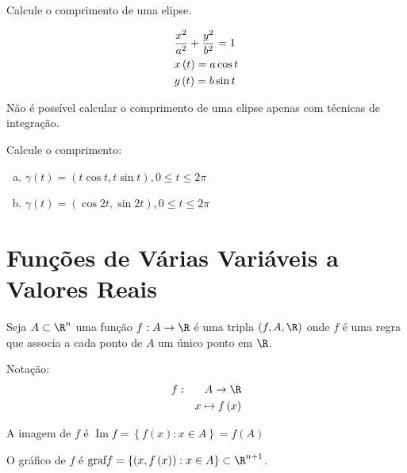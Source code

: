 \documentclass{book}
\begin{document}
\begin{ex}
Calcule o comprimento de uma elipse.

\end{ex}

\begin{sol}
\[
\begin{gathered}
\frac{{x^2 }}
{{a^2 }} + \frac{{y^2 }}
{{b^2 }} = 1 \hfill \\
x\left( t \right) = a\cos t \hfill \\
y\left( t \right) = b\sin t \hfill \\
\end{gathered}
\]

N\~ao \'e poss\'ivel calcular o comprimento de uma elipse apenas com t\'ecnicas de integra\c c\~ao.

\end{sol}

\begin{ex}
Calcule o comprimento:

\begin{enumerate}[a)]
      \item $\gamma \left( t \right) = \left( {t\cos t,t\sin t} \right),0 \leqslant t \leqslant 2\pi$
      \item $\gamma \left( t \right) = \left( {\cos 2t,\sin 2t} \right),0 \leqslant t \leqslant 2\pi$
\end{enumerate}
\end{ex}

\newpage 

\section{Fun\c c\~oes de V\'arias Vari\'aveis a Valores Reais} \label{sec09}

\begin{defn}
    Seja $A \subset \R^n$ uma fun\c c\~ao $f:A \to \R$ \'e uma tripla $\left( {f,A,\R} \right)$ onde $f$ \'e uma regra que associa a cada ponto de $A$ um \'unico ponto em $\R$.

Nota\c c\~ao:
\begin{eqnarray*}
f: &&A \to \R \hfill \\
&&x \mapsto f\left( x \right) \hfill \\
\end{eqnarray*}

    A imagem de $f$ \'e $\operatorname{Im} f = \left\{ {f\left( x \right):x \in A} \right\} = f\left( A \right)$

    O gr\'afico de $f$ \'e ${\text{graf}}f = \left\{ {\left( {x,f\left( x \right)} \right):x \in A} \right\} \subset \R^{n + 1}$.
\end{defn}
\end{document}
